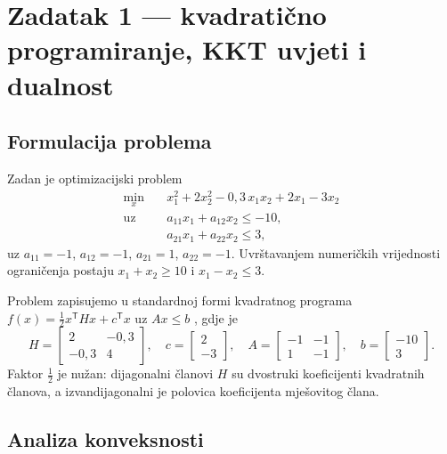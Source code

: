 
\section{Zadatak 1 --- kvadratično programiranje, KKT uvjeti i dualnost}
\label{sec:zad1}

\subsection{Formulacija problema}
\label{sec:zad1:formulacija}

Zadan je optimizacijski problem \cite[str.~1]{jokic_zadatak}
\begin{align}
  \min_{x}\quad & x_1^2 + 2x_2^2 - 0{,}3\,x_1x_2 + 2x_1 - 3x_2 \label{eq:z1cilj}\\
  \text{uz}\quad & a_{11}x_1 + a_{12}x_2 \le -10, \label{eq:z1g1}\\
                 & a_{21}x_1 + a_{22}x_2 \le 3, \label{eq:z1g2}
\end{align}
uz $a_{11}=-1$, $a_{12}=-1$, $a_{21}=1$, $a_{22}=-1$. Uvrštavanjem numeričkih
vrijednosti ograničenja postaju $x_1 + x_2 \ge 10$ i $x_1 - x_2 \le 3$.

Problem zapisujemo u standardnoj formi kvadratnog programa
$f(x) = \tfrac{1}{2}x^{\mathsf T}Hx + c^{\mathsf T}x$ uz $Ax \le b$
\cite[str.~34]{jokic_lpqp}, gdje je
\begin{equation}
  H = \begin{bmatrix} 2 & -0{,}3 \\ -0{,}3 & 4 \end{bmatrix}, \quad
  c = \begin{bmatrix} 2 \\ -3 \end{bmatrix}, \quad
  A = \begin{bmatrix} -1 & -1 \\ 1 & -1 \end{bmatrix}, \quad
  b = \begin{bmatrix} -10 \\ 3 \end{bmatrix}.
  \label{eq:z1std}
\end{equation}
Faktor $\tfrac12$ je nužan: dijagonalni članovi $H$ su dvostruki koeficijenti
kvadratnih članova, a izvandijagonalni je polovica koeficijenta mješovitog člana.

\subsection{Analiza konveksnosti}
\label{sec:zad1:konveksnost}

